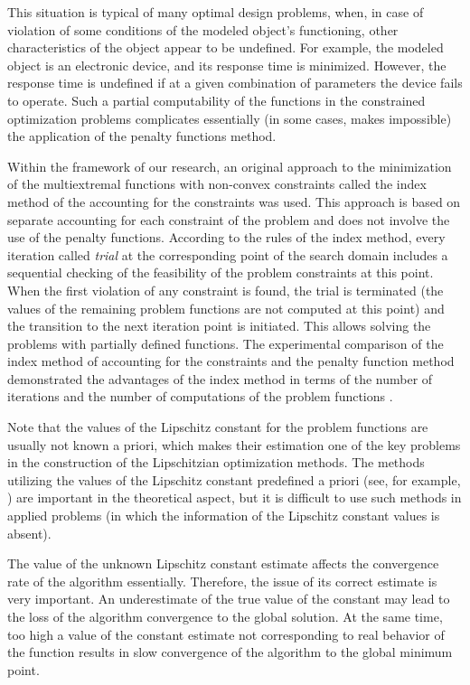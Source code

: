 \documentclass[twocolumn]{svjour3}          %
\begin{document}
	This situation is typical of many optimal design problems, when, in case of violation of some conditions of the modeled object's functioning, other characteristics of the object appear to be undefined. For example, the modeled object is an electronic device, and its response time is minimized. However, the response time is undefined if at a given combination of parameters the device fails to operate. Such a partial computability of the functions in the constrained optimization problems complicates essentially (in some cases, makes impossible) the application of the penalty functions method. 
	
	Within the framework of our research, an original approach to the minimization of the multiextremal functions with non-convex constraints called the index method of the accounting for the constraints 
	\cite{Strongin2000,Pugliese,Barkalov2002,Strongin2003} 
was used. This approach is based on separate accounting for each constraint of the problem and does not involve the use of the penalty functions. According to the rules of the index method, every iteration called \textit{trial} at the corresponding point of the search domain includes a sequential checking of the feasibility of the problem constraints at this point. When the first violation of any constraint is found, the trial is terminated (the values of the remaining problem functions are not computed at this point) and the transition to the next iteration point is initiated. This allows solving the problems with partially defined functions. The experimental comparison of the index method of accounting for the constraints and the penalty function method demonstrated the advantages of the index method in terms of the number of iterations and the number of computations of the problem functions \cite{Barkalov2017_1,Barkalov2017_2}.
	
	Note that the values of the Lipschitz constant for the problem functions are usually not known a priori, which  makes their estimation one of the key problems in the construction of the Lipschitzian optimization methods. The methods utilizing the values of the Lipschitz constant predefined a priori (see, for example, \cite{Piyavskii1972,Shubert1972,Wood1991,Meewella1988,Mladineo1986}) are important in the theoretical aspect, but it is difficult to use such methods in applied problems (in which the information of the Lipschitz constant values is absent).
		
		The value of the unknown Lipschitz constant estimate affects the convergence rate of the algorithm essentially. Therefore, the issue of its correct estimate is very important. An underestimate of the true value of the constant may lead to the loss of the algorithm convergence to the global solution. At the same time, too high a value of the constant estimate not corresponding to real behavior of the function results in slow convergence of the algorithm to the global minimum point. 
		
\end{document}

